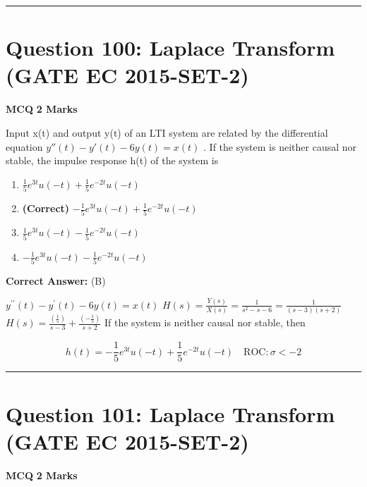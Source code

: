 \documentclass[11pt,a4paper]{article}
\begin{document}
\vspace{1.5em}
\hrule
\vspace{1.5em}

\section*{Question 100: Laplace Transform (GATE EC 2015-SET-2)}
\noindent \textbf{\color{primary}MCQ} \hfill \textbf{\color{secondary}2 Marks}


\noindent Input x(t) and output y(t) of an LTI system are related by the differential equation ${y}''(t)-{y}'(t)-6y(t)=x(t)$ . If the system is neither causal nor stable, the impulse response h(t) of the system is


\begin{enumerate}[label=(\Alph*)]
    \item $\frac{1}{5}e^{3t}u(-t)+\frac{1}{5}e^{-2t}u(-t)$
    \item \textbf{(Correct)} $-\frac{1}{5}e^{3t}u(-t)+\frac{1}{5}e^{-2t}u(-t)$
    \item $\frac{1}{5}e^{3t}u(-t)-\frac{1}{5}e^{-2t}u(-t)$
    \item $-\frac{1}{5}e^{3t}u(-t)-\frac{1}{5}e^{-2t}u(-t)$
\end{enumerate}

\noindent \textbf{Correct Answer:} (B)

\begin{tcolorbox}[solbox, title=Detailed Solution -- Question 100]
$y^{\prime \prime}(t)-y^{\prime}(t)-6 y(t)=x(t)$
$H(s)=\frac{Y(s)}{X(s)}=\frac{1}{s^{2}-s-6}=\frac{1}{(s-3)(s+2)}$
$H(s)=\frac{\left(\frac{1}{5}\right)}{s-3}+\frac{\left(-\frac{1}{5}\right)}{s+2}$
 If the system is neither causal nor stable, then

\[
h(t)=-\frac{1}{5} e^{3 t} u(-t)+\frac{1}{5} e^{-2 t} u(-t) \quad \mathrm{ROC}: \sigma < -2
\]
\end{tcolorbox}

\vspace{1.5em}
\hrule
\vspace{1.5em}

\section*{Question 101: Laplace Transform (GATE EC 2015-SET-2)}
\noindent \textbf{\color{primary}MCQ} \hfill \textbf{\color{secondary}2 Marks}
\end{document}
